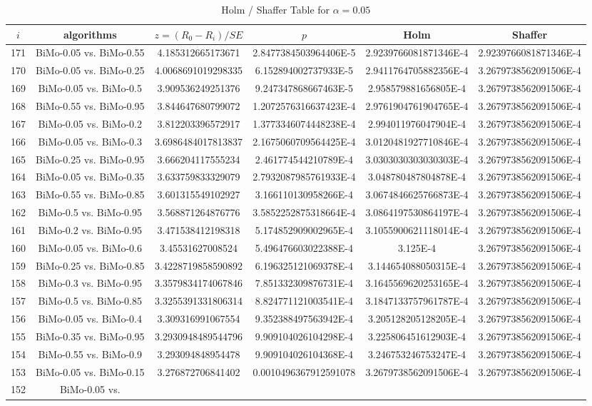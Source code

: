 \documentclass[a4paper,10pt]{article}
\begin{document}
\begin{landscape}
\begin{table}[!htp]
\centering\tiny
\caption{Holm / Shaffer Table for $\alpha=0.05$}
\begin{tabular}{cccccc}
$i$&algorithms&$z=(R_0 - R_i)/SE$&$p$&Holm&Shaffer\\
\hline
171&BiMo-0.05 vs. BiMo-0.55&4.185312665173671&2.8477384503964406E-5&2.9239766081871346E-4&2.9239766081871346E-4\\170&BiMo-0.05 vs. BiMo-0.25&4.0068691019298335&6.152894002737933E-5&2.9411764705882356E-4&3.2679738562091506E-4\\169&BiMo-0.05 vs. BiMo-0.5&3.909536249251376&9.247347868667463E-5&2.958579881656805E-4&3.2679738562091506E-4\\168&BiMo-0.55 vs. BiMo-0.95&3.844647680799072&1.2072576316637423E-4&2.9761904761904765E-4&3.2679738562091506E-4\\167&BiMo-0.05 vs. BiMo-0.2&3.812203396572917&1.3773346074448238E-4&2.994011976047904E-4&3.2679738562091506E-4\\166&BiMo-0.05 vs. BiMo-0.3&3.6986484017813837&2.1675060709564425E-4&3.0120481927710846E-4&3.2679738562091506E-4\\165&BiMo-0.25 vs. BiMo-0.95&3.666204117555234&2.461774544210789E-4&3.0303030303030303E-4&3.2679738562091506E-4\\164&BiMo-0.05 vs. BiMo-0.35&3.633759833329079&2.7932087985761933E-4&3.048780487804878E-4&3.2679738562091506E-4\\163&BiMo-0.55 vs. BiMo-0.85&3.601315549102927&3.166110130958266E-4&3.0674846625766873E-4&3.2679738562091506E-4\\162&BiMo-0.5 vs. BiMo-0.95&3.568871264876776&3.5852252875318664E-4&3.0864197530864197E-4&3.2679738562091506E-4\\161&BiMo-0.2 vs. BiMo-0.95&3.471538412198318&5.174852909002965E-4&3.1055900621118014E-4&3.2679738562091506E-4\\160&BiMo-0.05 vs. BiMo-0.6&3.45531627008524&5.496476603022388E-4&3.125E-4&3.2679738562091506E-4\\159&BiMo-0.25 vs. BiMo-0.85&3.4228719858590892&6.196325121069378E-4&3.144654088050315E-4&3.2679738562091506E-4\\158&BiMo-0.3 vs. BiMo-0.95&3.3579834174067846&7.851332309876731E-4&3.1645569620253165E-4&3.2679738562091506E-4\\157&BiMo-0.5 vs. BiMo-0.85&3.3255391331806314&8.824771121003541E-4&3.1847133757961787E-4&3.2679738562091506E-4\\156&BiMo-0.05 vs. BiMo-0.4&3.309316991067554&9.352388497563942E-4&3.205128205128205E-4&3.2679738562091506E-4\\155&BiMo-0.35 vs. BiMo-0.95&3.2930948489544796&9.909104026104298E-4&3.225806451612903E-4&3.2679738562091506E-4\\154&BiMo-0.55 vs. BiMo-0.9&3.293094848954478&9.909104026104368E-4&3.246753246753247E-4&3.2679738562091506E-4\\153&BiMo-0.05 vs. BiMo-0.15&3.276872706841402&0.0010496367912591078&3.2679738562091506E-4&3.2679738562091506E-4\\152&BiMo-0.05 vs. 
\end{tabular}
\end{table}
\end{landscape}
\end{document}
